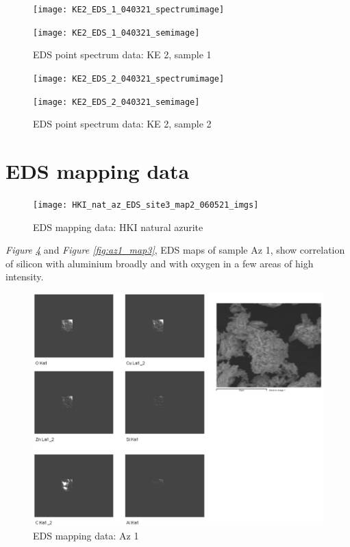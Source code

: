 \begin{figure}[H]
\centering
\begin{minipage}{.45\textwidth}
  \centering
  \texttt{[image: KE2\_EDS\_1\_040321\_spectrumimage]}
\end{minipage}
\begin{minipage}{.45\textwidth}
  \centering
  \texttt{[image: KE2\_EDS\_1\_040321\_semimage]}
\end{minipage}
\caption[EDS point spectrum data: KE 2, sample 1]{EDS point spectrum data: KE 2, sample 1}
\label{fig:ke2_point_eds_1}
\end{figure}

\begin{figure}[H]
\centering
\begin{minipage}{.45\textwidth}
  \centering
  \texttt{[image: KE2\_EDS\_2\_040321\_spectrumimage]}
\end{minipage}
\begin{minipage}{.45\textwidth}
  \centering
  \texttt{[image: KE2\_EDS\_2\_040321\_semimage]}
\end{minipage}
\caption[EDS point spectrum data: KE 2, sample 2]{EDS point spectrum data: KE 2, sample 2}
\label{fig:ke2_point_eds_2}
\end{figure}

\section{EDS mapping data}

\begin{figure}[H]
\centering
  \texttt{[image: HKI\_nat\_az\_EDS\_site3\_map2\_060521\_imgs]}
\caption[EDS mapping data: HKI natural azurite]{EDS mapping data: HKI natural azurite}
\label{fig:hki_map2}
\end{figure}

\textit{Figure \ref{fig:az1_map2}} and \textit{Figure \ref{fig:az1_map3}}, EDS maps of sample Az 1, show correlation of silicon with aluminium broadly and with oxygen in a few areas of high intensity.

\begin{figure}[H]
\centering
  \includegraphics[width=0.9\linewidth]{Az1_EDS_map1_250221_imgs}
\caption[EDS mapping data: Az 1]{EDS mapping data: Az 1}
\label{fig:az1_map2}
\end{figure}

